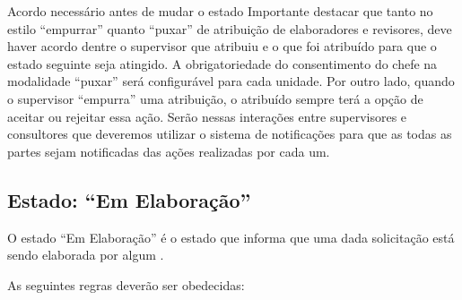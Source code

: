 \begin{importante}{Acordo necessário antes de mudar o estado}
	Importante destacar que tanto no estilo ``empurrar'' quanto ``puxar'' de atribuição de elaboradores e revisores, deve haver acordo dentre o supervisor que atribuiu e o \CL que foi atribuído para que o estado seguinte seja atingido. A obrigatoriedade do consentimento do chefe na modalidade ``puxar'' será configurável para cada unidade. Por outro lado, quando o supervisor ``empurra'' uma atribuição, o \CL atribuído sempre terá a opção de aceitar ou rejeitar essa ação. Serão nessas interações entre supervisores e consultores que deveremos utilizar o sistema de notificações para que as todas as partes sejam notificadas das ações realizadas por cada um.
\end{importante}


\subsection{Estado: ``Em Elaboração''}

O estado ``Em Elaboração'' é o estado que informa que uma dada solicitação está sendo elaborada por algum \CL. 

As seguintes regras deverão ser obedecidas:

